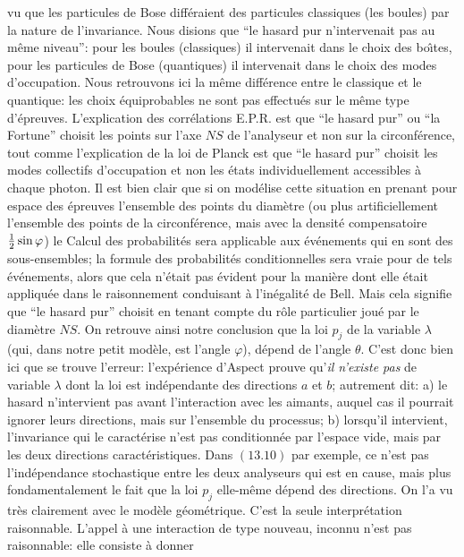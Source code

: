 vu que les particules de Bose diff\'eraient  des particules classiques (les
boules) par la nature de l'invariance. Nous disions 
que  ``le hasard pur n'intervenait pas au m\^eme niveau'': pour les boules 
(classiques) il intervenait dans le choix des bo\^\i tes, pour les 
particules de Bose (quantiques) il intervenait dans le choix des modes 
d'occupation. Nous retrouvons ici la m\^eme diff\'erence entre le 
classique et le quantique: les choix \'equiprobables ne sont pas 
effectu\'es sur le m\^eme type d'\'epreuves. L'explication des 
corr\'elations E.P.R. est que ``le hasard pur'' ou ``la Fortune'' choisit 
les points sur l'axe $NS$ de l'analyseur et non sur la circonf\'erence,  
tout comme l'explication de la loi de Planck est que ``le hasard pur'' 
choisit les modes collectifs d'occupation et non les \'etats 
individuellement accessibles \`a chaque photon.  Il est bien clair que 
si on mod\'elise cette situation en prenant pour espace des \'epreuves
l'ensemble des points du diam\`etre (ou plus artificiellement l'ensemble 
des points de la circonf\'erence, mais avec la densit\'e compensatoire 
${1\over 2} \sin\varphi$) le Calcul des probabilit\'es sera applicable  
aux \'ev\'enements qui en sont des sous-ensembles; la formule des 
probabilit\'es conditionnelles sera vraie pour de tels \'ev\'enements,
alors que cela n'\'etait pas \'evident pour la mani\`ere dont elle \'etait
appliqu\'ee dans le raisonnement conduisant \`a l'in\'egalit\'e de Bell. 
Mais cela signifie que ``le hasard pur'' choisit en tenant compte du
r\^ole particulier jou\'e par le diam\`etre $NS$.  On retrouve ainsi notre
conclusion que la loi $p_j$ de la variable $\lambda$ (qui,  dans notre
petit mod\`ele,  est l'angle $\varphi$),  d\'epend de l'angle $\theta$. 
\medskip 
C'est donc bien ici que se trouve l'erreur: l'exp\'erience d'Aspect prouve 
qu'{\it il n'existe pas} de variable $\lambda$ dont la loi est 
ind\'ependante des directions $a$ et $b$; autrement dit: 
\smallskip 
a) le hasard n'intervient pas avant l'interaction avec les aimants,  auquel
cas il pourrait ignorer leurs directions,  mais sur l'ensemble du processus;
\smallskip 
b) lorsqu'il intervient, l'invariance qui le caract\'erise n'est pas
conditionn\'ee par l'espace vide, mais par les deux directions caract\'eristiques. 
\medskip 
Dans $(13.10)$ par exemple, ce n'est pas l'ind\'ependance stochastique 
entre les deux analyseurs qui est en cause, mais plus fondamentalement le
fait que la loi $p_j$ elle-m\^eme d\'epend des directions.  On l'a vu tr\`es
clairement avec le mod\`ele g\'eom\'etrique. 
\medskip
C'est la seule interpr\'etation raisonnable.  L'appel \`a une {\og interaction
de type nouveau,  inconnu\fg} n'est pas raisonnable:  elle consiste \`a donner
